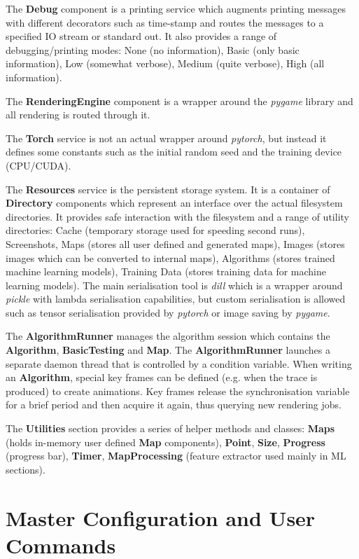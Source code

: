 \begin{appendices}
The \textbf{Debug} component is a printing service which augments printing messages with different decorators such as time-stamp and routes the messages to a specified IO stream or standard out. It also provides a range of debugging/printing modes: None (no information), Basic (only basic information), Low (somewhat verbose), Medium (quite verbose), High (all information).

The \textbf{RenderingEngine} component is a wrapper around the \textit{pygame} library and all rendering is routed through it.

The \textbf{Torch} service is not an actual wrapper around \textit{pytorch}, but instead it defines some constants such as the initial random seed and the training device (CPU/CUDA).

The \textbf{Resources} service is the persistent storage system. It is a container of \textbf{Directory} components which represent an interface over the actual filesystem directories. It provides safe interaction with the filesystem and a range of utility directories: Cache (temporary storage used for speeding second runs), Screenshots, Maps (stores all user defined and generated maps), Images (stores images which can be converted to internal maps), Algorithms (stores trained machine learning models), Training Data (stores training data for machine learning models). The main serialisation tool is \textit{dill} which is a wrapper around \textit{pickle} with lambda serialisation capabilities, but custom serialisation is allowed such as tensor serialisation provided by \textit{pytorch} or image saving by \textit{pygame}.

The \textbf{AlgorithmRunner} manages the algorithm session which contains the \textbf{Algorithm}, \textbf{BasicTesting} and \textbf{Map}. The \textbf{AlgorithmRunner} launches a separate daemon thread that is controlled by a condition variable. When writing an \textbf{Algorithm}, special key frames can be defined (e.g. when the trace is produced) to create animations. Key frames release the synchronisation variable for a brief period and then acquire it again, thus querying new rendering jobs.

The \textbf{Utilities} section provides a series of helper methods and classes: \textbf{Maps} (holds in-memory user defined \textbf{Map} components), \textbf{Point}, \textbf{Size}, \textbf{Progress} (progress bar), \textbf{Timer}, \textbf{MapProcessing} (feature extractor used mainly in ML sections).

\section{Master Configuration and User Commands}


\end{appendices}

